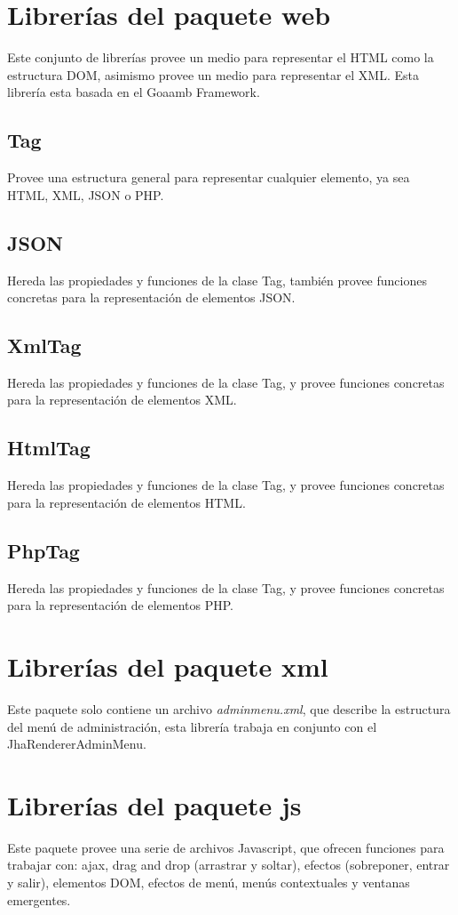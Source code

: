 \section{Librer\'ias del paquete \textsf{web}}
Este conjunto de librer\'ias provee un medio para representar el HTML como la estructura DOM, asimismo provee un medio para representar el XML. Esta librer\'ia esta basada en el Goaamb Framework.

\subsection{Tag}
Provee una estructura general para representar cualquier elemento, ya sea HTML, XML, JSON o PHP.

\subsection{JSON}
Hereda las propiedades y funciones de la clase Tag, tambi\'en provee funciones concretas para la representaci\'on de elementos JSON.

\subsection{XmlTag}
Hereda las propiedades y funciones de la clase Tag, y provee funciones concretas para la representaci\'on de elementos XML.

\subsection{HtmlTag}
Hereda las propiedades y funciones de la clase Tag, y provee funciones concretas para la representaci\'on de elementos HTML.

\subsection{PhpTag}
Hereda las propiedades y funciones de la clase Tag, y provee funciones concretas para la representaci\'on de elementos PHP.

\section{Librer\'ias del paquete \textsf{xml}}
Este paquete solo contiene un archivo \textit{adminmenu.xml}, que describe la estructura del men\'u de administraci\'on, esta librer\'ia trabaja en conjunto con el JhaRendererAdminMenu.

\section{Librer\'ias del paquete \textsf{js}}
Este paquete provee una serie de archivos Javascript, que ofrecen funciones para trabajar con: ajax, drag and drop (arrastrar y soltar), efectos (sobreponer, entrar y salir), elementos DOM, efectos de men\'u, men\'us contextuales y ventanas emergentes.

